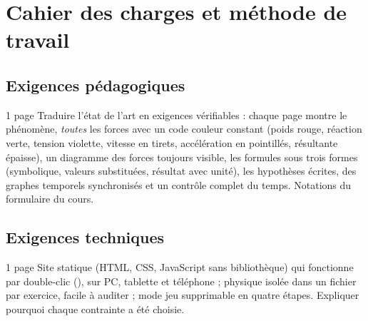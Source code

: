 
\chapter{Cahier des charges et méthode de travail}
\label{chap:cahier}

\section{Exigences pédagogiques}

\begin{arediger}{1 page}
Traduire l'état de l'art en exigences vérifiables : chaque page montre le
phénomène, \emph{toutes} les forces avec un code couleur constant (poids
rouge, réaction verte, tension violette, vitesse en tirets, accélération en
pointillés, résultante épaisse), un diagramme des forces toujours visible,
les formules sous trois formes (symbolique, valeurs substituées, résultat
avec unité), les hypothèses écrites, des graphes temporels synchronisés et
un contrôle complet du temps. Notations du formulaire du cours.
\end{arediger}

\section{Exigences techniques}

\begin{arediger}{1 page}
Site statique (HTML, CSS, JavaScript sans bibliothèque) qui fonctionne par
double-clic (), sur PC, tablette et téléphone ; physique
isolée dans un fichier par exercice, facile à auditer ; mode jeu supprimable
en quatre étapes. Expliquer pourquoi chaque contrainte a été choisie.
\end{arediger}


